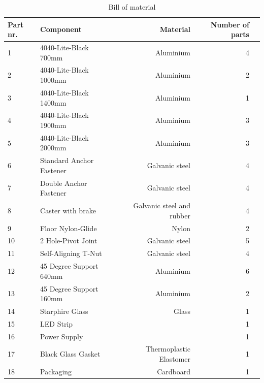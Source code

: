 \documentclass[a4paper]{jpconf}
\begin{document}
	\begin{table}[]
		\centering
		\begin{tabular}{llrrr}
			
			Part nr. & Component & Material & Number of parts  \\
			\hline
			1&4040-Lite-Black 700mm  & Aluminium  & 4  \\
			2&4040-Lite-Black 1000mm & Aluminium &  2\\
			3&4040-Lite-Black 1400mm & Aluminium & 1  \\
			4&4040-Lite-Black 1900mm & Aluminium & 3  \\
			5&4040-Lite-Black 2000mm  & Aluminium &3  \\
			6&Standard Anchor Fastener  & Galvanic steel&4  \\
			7&Double Anchor Fastener  &Galvanic steel & 4  \\
			8&Caster with brake  & Galvanic steel and rubber & 4  \\
			9&Floor Nylon-Glide  & Nylon& 2 \\
			10&2 Hole-Pivot Joint  & Galvanic steel & 5  \\
			11&Self-Aligning T-Nut  & Galvanic steel &4   \\
			12&45 Degree Support 640mm  & Aluminium &  6 \\
			13&45 Degree Support 160mm  & Aluminium & 2  \\
			14&Starphire Glass& Glass &1\\
			15&LED Strip& & 1\\
			16&Power Supply & & 1 \\
			17&Black Glass Gasket & Thermoplastic Elastomer & 1\\
			18&Packaging & Cardboard & 1  \\ %
		\end{tabular}
		\caption{Bill of material }
		\label{tab:BOM}
	\end{table}
	
\end{document}
